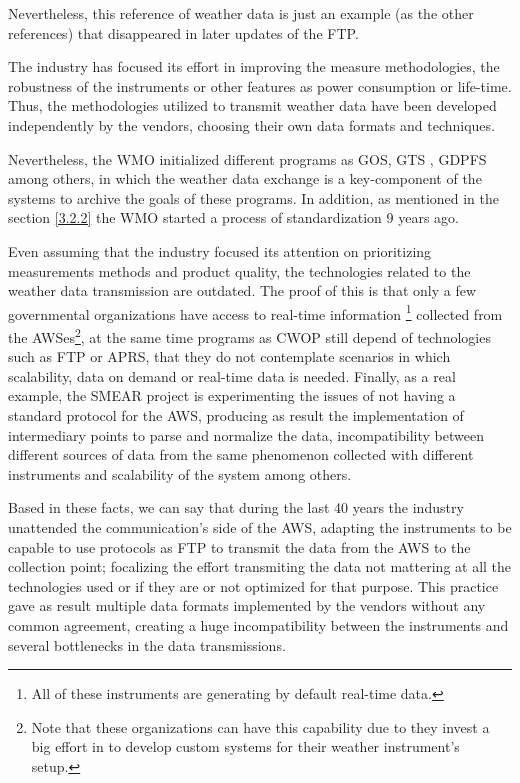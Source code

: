 Nevertheless, this reference of weather data is just an example (as the other references) that disappeared in later updates of the \gls{FTP}. 

The industry has focused its effort in improving the measure methodologies, the robustness of the instruments or other features as power consumption or life-time. Thus, the methodologies utilized to transmit weather data have been developed independently by the vendors, choosing their own data formats and techniques.

Nevertheless, the \gls{WMO} initialized different programs as \gls{GOS}, \gls{GTS} , \gls{GDPFS} \cite{WMO} among others, in which the weather data exchange is a key-component of the systems to archive the goals of these programs. In addition, as mentioned in the section \ref{3.2.2} the \gls{WMO} started a process of standardization 9 years ago.

Even assuming that the industry focused its attention on prioritizing measurements methods and product quality, the technologies related to the weather data transmission are outdated. The proof of this is that only a few governmental organizations have access to real-time information \footnote{All of these instruments are generating by default real-time data.} collected from the \gls{AWS}es\footnote{Note that these organizations can have this capability due to they invest a big effort in to develop custom systems for their weather instrument's setup.}, at the same time programs as \gls{CWOP} still depend of technologies such as \gls{FTP} or \gls{APRS}, that they do not contemplate scenarios in which scalability, data on demand or real-time data is needed.  Finally, as a real example, the SMEAR project\cite{SMEAR} is experimenting the issues of not having a standard protocol for the \gls{AWS}, producing as result the implementation of intermediary points to parse and normalize the data, incompatibility between different sources of data from the same phenomenon collected with different instruments and scalability of the system among others.

Based in these facts, we can say that during the last 40 years the industry unattended the communication's side of the \gls{AWS}, adapting the instruments to be capable to use protocols as \gls{FTP} to transmit the data from the \gls{AWS} to the collection point; focalizing the effort transmiting the data not mattering at all the technologies used or if they are or not optimized for that purpose. This practice gave as result multiple data formats implemented by the vendors without any common agreement, creating a huge incompatibility between the instruments and several bottlenecks in the data transmissions. 

